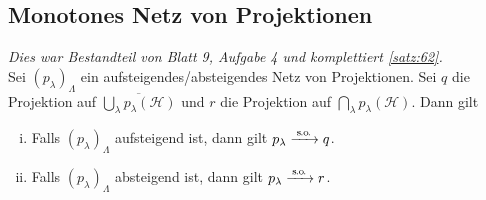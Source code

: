 \subsection{Monotones Netz von Projektionen} %
\label{sub:mon_proj}
\emph{Dies war Bestandteil von Blatt 9, Aufgabe 4 und komplettiert \autoref{satz:62}.} \smallskip \\
Sei $(p_\lambda)_\Lambda$ ein aufsteigendes/absteigendes Netz von Projektionen. 
Sei $q$ die Projektion auf $\overline{\bigcup_\lambda p_\lambda(\mathcal{H})}$ und $r$ die Projektion auf $\bigcap_\lambda p_\lambda(\mathcal{H})$. Dann gilt
\begin{enumerate}[(i),itemsep=0pt]
	\item Falls $(p_\lambda)_\Lambda$ aufsteigend ist, dann gilt $p_\lambda \grenzw{\so} q$.
	\item Falls $(p_\lambda)_\Lambda$ absteigend ist, dann gilt $p_\lambda \grenzw{\so} r$.
\end{enumerate}
